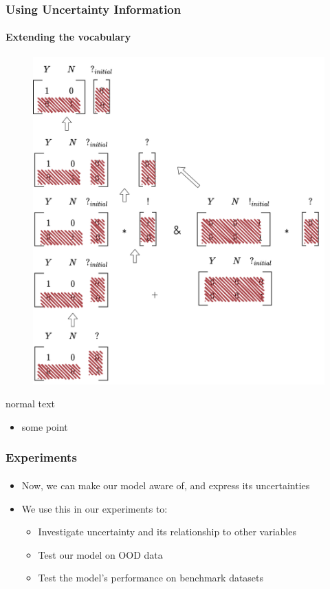 \documentclass[9pt]{beamer}
\begin{document}
\begin{frame}
\frametitle{Using Uncertainty Information}
\framesubtitle{Extending the vocabulary}
\begin{figure}
	\includegraphics[width=0.6\linewidth]{images/extended_vocab_backward.pdf}
\end{figure}
\end{frame}



\begin{frame}[plain]{normal text}
\begin{itemize}
	\item some point
\end{itemize}
\end{frame}

\begin{frame}
\frametitle{Experiments}
\framesubtitle{}
\begin{itemize}
	\item Now, we can make our model aware of, and express its uncertainties
	\item We use this in our experiments to:
	\begin{itemize}
		\item Investigate uncertainty and its relationship to other variables
		\item Test our model on OOD data
		\item Test the model's performance on benchmark datasets
	\end{itemize}
\end{itemize}
\end{frame}
\end{document}
